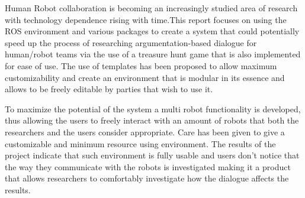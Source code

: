 Human Robot collaboration is becoming an increasingly studied area of research with technology dependence rising with time.This report focuses on using the ROS environment and various packages to create a system that could potentially speed up the process of researching argumentation-based dialogue for human/robot teams via the use of a treasure hunt game that is also implemented for ease of use. The use of templates has been proposed to allow maximum customizability and create an environment that is modular in its essence and allows to be freely editable by parties that wish to use it.

To maximize the potential of the system a multi robot functionality is developed, thus allowing the users to freely interact with an amount of robots that both the researchers and the users consider appropriate. Care has been given to give a customizable and minimum resource using environment. The results of the project indicate that such environment is fully usable and users don't notice that the way they communicate with the robots is investigated making it a product that allows researchers to comfortably investigate how the dialogue affects the results.